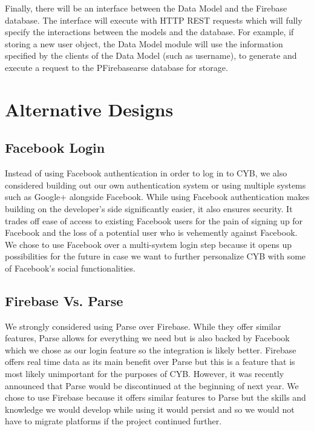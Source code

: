\documentclass[11pt]{article}
\begin{document}
Finally, there will be an interface between the Data Model and the Firebase database. The interface will execute with HTTP REST requests which will fully specify the interactions between the models and the database. For example, if storing a new user object, the Data Model module will use the information specified by the clients of the Data Model (such as username), to generate and execute a request to the PFirebasearse database for storage.

\section*{Alternative Designs}

\subsection{Facebook Login}

Instead of using Facebook authentication in order to log in to CYB, we also considered building out our own authentication system or using multiple systems such as Google+ alongside Facebook. While using Facebook authentication makes building on the developer’s side significantly easier, it also ensures security. It trades off ease of access to existing Facebook users for the pain of signing up for Facebook and the loss of a potential user who is vehemently against Facebook. We chose to use Facebook over a multi-system login step because it opens up possibilities for the future in case we want to further personalize CYB with some of Facebook’s social functionalities. 

\subsection{Firebase Vs. Parse}

We strongly considered using Parse over Firebase. While they offer similar features, Parse allows for everything we need but is also backed by Facebook which we chose as our login feature so the integration is likely better. Firebase offers real time data as its main benefit over Parse but this is a feature that is most likely unimportant for the purposes of CYB. However, it was recently announced that Parse would be discontinued at the beginning of next year. We chose to use Firebase because it offers similar features to Parse but the skills and knowledge we would develop while using it would persist and so we would not have to migrate platforms if the project continued further.
\end{document}
